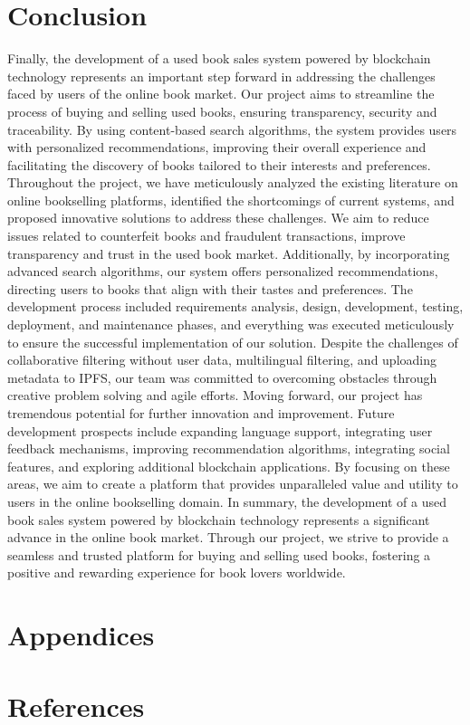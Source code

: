 \documentclass{article}
\begin{document}
\section{Conclusion}
Finally, the development of a used book sales system powered by blockchain technology represents an important step forward in addressing the challenges faced by users of the online book market. Our project aims to streamline the process of buying and selling used books, ensuring transparency, security and traceability.
By using content-based search algorithms, the system provides users with personalized recommendations, improving their overall experience and facilitating the discovery of books tailored to their interests and preferences.
Throughout the project, we have meticulously analyzed the existing literature on online bookselling platforms, identified the shortcomings of current systems, and proposed innovative solutions to address these challenges. We aim to reduce issues related to counterfeit books and fraudulent transactions, improve transparency and trust in the used book market.
Additionally, by incorporating advanced search algorithms, our system offers personalized recommendations, directing users to books that align with their tastes and preferences.
The development process included requirements analysis, design, development, testing, deployment, and maintenance phases, and everything was executed meticulously to ensure the successful implementation of our solution.
Despite the challenges of collaborative filtering without user data, multilingual filtering, and uploading metadata to IPFS, our team was committed to overcoming obstacles through creative problem solving and agile efforts.
Moving forward, our project has tremendous potential for further innovation and improvement. Future development prospects include expanding language support, integrating user feedback mechanisms, improving recommendation algorithms, integrating social features, and exploring additional blockchain applications.
By focusing on these areas, we aim to create a platform that provides unparalleled value and utility to users in the online bookselling domain.
In summary, the development of a used book sales system powered by blockchain technology represents a significant advance in the online book market.
Through our project, we strive to provide a seamless and trusted platform for buying and selling used books, fostering a positive and rewarding experience for book lovers worldwide.

\section{Appendices}

\section{References}
\end{document}
